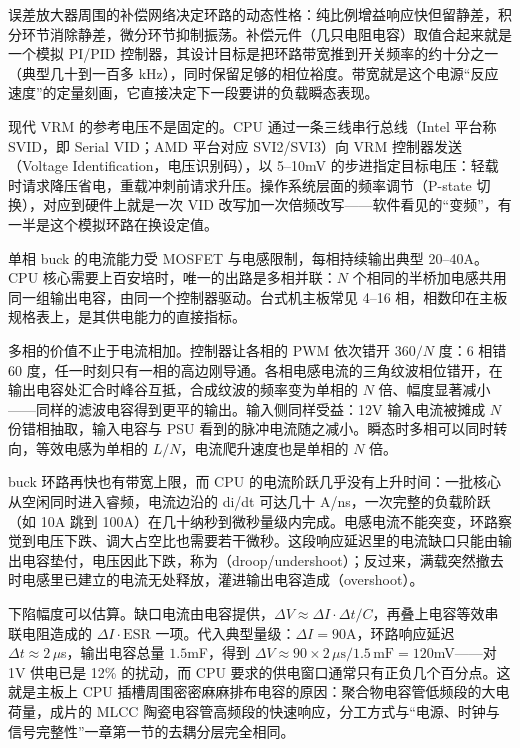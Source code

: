 误差放大器周围的补偿网络决定环路的动态性格：纯比例增益响应快但留静差，积分环节消除静差，微分环节抑制振荡。补偿元件（几只电阻电容）取值合起来就是一个模拟 PI/PID 控制器，其设计目标是把环路带宽推到开关频率的约十分之一（典型几十到一百多 kHz），同时保留足够的相位裕度。带宽就是这个电源“反应速度”的定量刻画，它直接决定下一段要讲的负载瞬态表现。

现代 VRM 的参考电压不是固定的。CPU 通过一条三线串行总线（Intel 平台称 SVID，即 Serial VID；AMD 平台对应 SVI2/SVI3）向 VRM 控制器发送 （Voltage Identification，电压识别码），以 5--10mV 的步进指定目标电压：轻载时请求降压省电，重载冲刺前请求升压。操作系统层面的频率调节（P-state 切换），对应到硬件上就是一次 VID 改写加一次倍频改写——软件看见的“变频”，有一半是这个模拟环路在换设定值。


单相 buck 的电流能力受 MOSFET 与电感限制，每相持续输出典型 20--40A。CPU 核心需要上百安培时，唯一的出路是多相并联：$N$ 个相同的半桥加电感共用同一组输出电容，由同一个控制器驱动。台式机主板常见 4--16 相，相数印在主板规格表上，是其供电能力的直接指标。

多相的价值不止于电流相加。控制器让各相的 PWM 依次错开 $360/N$ 度：6 相错 60 度，任一时刻只有一相的高边刚导通。各相电感电流的三角纹波相位错开，在输出电容处汇合时峰谷互抵，合成纹波的频率变为单相的 $N$ 倍、幅度显著减小——同样的滤波电容得到更平的输出。输入侧同样受益：12V 输入电流被摊成 $N$ 份错相抽取，输入电容与 PSU 看到的脉冲电流随之减小。瞬态时多相可以同时转向，等效电感为单相的 $L/N$，电流爬升速度也是单相的 $N$ 倍。


buck 环路再快也有带宽上限，而 CPU 的电流阶跃几乎没有上升时间：一批核心从空闲同时进入睿频，电流边沿的 di/dt 可达几十 A/ns，一次完整的负载阶跃（如 10A 跳到 100A）在几十纳秒到微秒量级内完成。电感电流不能突变，环路察觉到电压下跌、调大占空比也需要若干微秒。这段响应延迟里的电流缺口只能由输出电容垫付，电压因此下跌，称为（droop/undershoot）；反过来，满载突然撤去时电感里已建立的电流无处释放，灌进输出电容造成（overshoot）。

下陷幅度可以估算。缺口电流由电容提供，$\Delta V \approx \Delta I \cdot \Delta t / C$，再叠上电容等效串联电阻造成的 $\Delta I \cdot \mathrm{ESR}$ 一项。代入典型量级：$\Delta I = 90$A，环路响应延迟 $\Delta t \approx 2\,\mu$s，输出电容总量 $1.5$mF，得到 $\Delta V \approx 90 \times 2\,\mu\mathrm{s} / 1.5\,\mathrm{mF} = 120$mV——对 1V 供电已是 12\% 的扰动，而 CPU 要求的供电窗口通常只有正负几个百分点。这就是主板上 CPU 插槽周围密密麻麻排布电容的原因：聚合物电容管低频段的大电荷量，成片的 MLCC 陶瓷电容管高频段的快速响应，分工方式与“电源、时钟与信号完整性”一章第一节的去耦分层完全相同。

